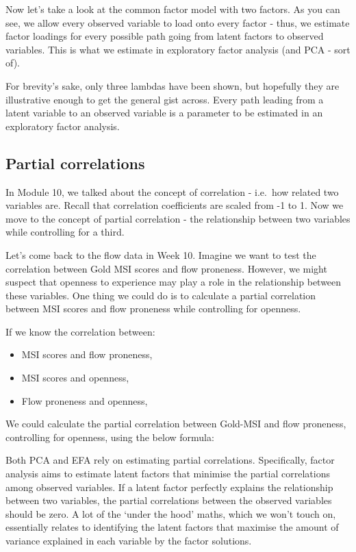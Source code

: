 \documentclass[
]{book}
\providecommand{\tightlist}{%
  \setlength{\itemsep}{0pt}\setlength{\parskip}{0pt}}
\begin{document}


Now let's take a look at the common factor model with two factors. As you can see, we allow every observed variable to load onto every factor - thus, we estimate factor loadings for every possible path going from latent factors to observed variables. This is what we estimate in exploratory factor analysis (and PCA - sort of).

For brevity's sake, only three lambdas have been shown, but hopefully they are illustrative enough to get the general gist across. Every path leading from a latent variable to an observed variable is a parameter to be estimated in an exploratory factor analysis.



\subsection{Partial correlations}\label{partial-correlations}

In Module 10, we talked about the concept of correlation - i.e.~how related two variables are. Recall that correlation coefficients are scaled from -1 to 1. Now we move to the concept of partial correlation - the relationship between two variables while controlling for a third.

Let's come back to the flow data in Week 10. Imagine we want to test the correlation between Gold MSI scores and flow proneness. However, we might suspect that openness to experience may play a role in the relationship between these variables. One thing we could do is to calculate a partial correlation between MSI scores and flow proneness while controlling for openness.

If we know the correlation between:

\begin{itemize}
\tightlist
\item
  MSI scores and flow proneness,
\item
  MSI scores and openness,
\item
  Flow proneness and openness,
\end{itemize}

We could calculate the partial correlation between Gold-MSI and flow proneness, controlling for openness, using the below formula:

Both PCA and EFA rely on estimating partial correlations. Specifically, factor analysis aims to estimate latent factors that minimise the partial correlations among observed variables. If a latent factor perfectly explains the relationship between two variables, the partial correlations between the observed variables should be zero. A lot of the `under the hood' maths, which we won't touch on, essentially relates to identifying the latent factors that maximise the amount of variance explained in each variable by the factor solutions.
\end{document}
